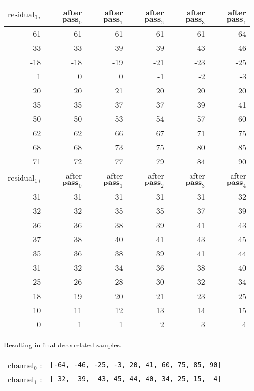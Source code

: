 {
  \begin{tabular}{|r|r|r|r|r|r|}
    \hline
    $\text{residual}_{0~i}$ &
    after $\textbf{pass}_0$ &
    after $\textbf{pass}_1$ &
    after $\textbf{pass}_2$ &
    after $\textbf{pass}_3$ &
    after $\textbf{pass}_4$ \\
    \hline
    -61 & -61 & -61 & -61 & -61 & -64 \\
    -33 & -33 & -39 & -39 & -43 & -46 \\
    -18 & -18 & -19 & -21 & -23 & -25 \\
    1 & 0 & 0 & -1 & -2 & -3 \\
    20 & 20 & 21 & 20 & 20 & 20 \\
    35 & 35 & 37 & 37 & 39 & 41 \\
    50 & 50 & 53 & 54 & 57 & 60 \\
    62 & 62 & 66 & 67 & 71 & 75 \\
    68 & 68 & 73 & 75 & 80 & 85 \\
    71 & 72 & 77 & 79 & 84 & 90 \\
    \hline
    \hline
    $\text{residual}_{1~i}$ &
    after $\textbf{pass}_0$ &
    after $\textbf{pass}_1$ &
    after $\textbf{pass}_2$ &
    after $\textbf{pass}_3$ &
    after $\textbf{pass}_4$ \\
    \hline
    31 & 31 & 31 & 31 & 31 & 32 \\
    32 & 32 & 35 & 35 & 37 & 39 \\
    36 & 36 & 38 & 39 & 41 & 43 \\
    37 & 38 & 40 & 41 & 43 & 45 \\
    35 & 36 & 38 & 39 & 41 & 44 \\
    31 & 32 & 34 & 36 & 38 & 40 \\
    25 & 26 & 28 & 30 & 32 & 34 \\
    18 & 19 & 20 & 21 & 23 & 25 \\
    10 & 11 & 12 & 13 & 14 & 15 \\
    0 & 1 & 1 & 2 & 3 & 4 \\
    \hline
  \end{tabular}
}
\par
\noindent
Resulting in final decorrelated samples:
\newline
\begin{tabular}{rr}
$\text{channel}_0$ : & \texttt{[-64,~-46,~-25,~-3,~20,~41,~60,~75,~85,~90]} \\
$\text{channel}_1$ : & \texttt{[~32,~~39,~~43,~45,~44,~40,~34,~25,~15,~~4]} \\
\end{tabular}

